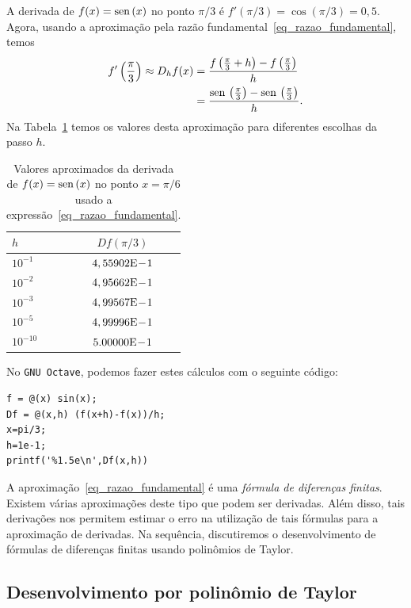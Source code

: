\begin{ex}\label{ex_intro_deriv}
  A derivada de $f(x) = \operatorname{sen}\,(x)$ no ponto $\pi/3$ é $f'(\pi/3) = \cos(\pi/3)=0,5$. Agora, usando a aproximação pela razão fundamental~\eqref{eq_razao_fundamental}, temos
  \begin{align}
    f'\left(\frac{\pi}{3}\right) \approx D_hf(x) &= \frac{f\left(\frac{\pi}{3}+h\right)-f\left(\frac{\pi}{3}\right)}{h}\\
          &= \frac{\operatorname{sen}\,\left(\frac{\pi}{3}\right)-\operatorname{sen}\,\left(\frac{\pi}{3}\right)}{h}. 
  \end{align}
Na Tabela~\ref{tab:ex_intro_deriv} temos os valores desta aproximação para diferentes escolhas da passo $h$.

\begin{table}[hp]
  \centering
  \begin{tabular}{l|c}
    $h$ & $Df(\pi/3)$ \\ \hline
    $10^{-1}$ & $4,55902\mathrm{E}\!-\!1$ \\
    $10^{-2}$ & $4,95662\mathrm{E}\!-\!1$ \\
    $10^{-3}$ & $4,99567\mathrm{E}\!-\!1$ \\
    $10^{-5}$ & $4,99996\mathrm{E}\!-\!1$ \\
    $10^{-10}$ & $5.00000\mathrm{E}\!-\!1$ \\\hline
  \end{tabular}
  \caption{Valores aproximados da derivada de $f(x)=\operatorname{sen}\,(x)$ no ponto $x=\pi/6$ usado a expressão~\eqref{eq_razao_fundamental}.}
  \label{tab:ex_intro_deriv}
\end{table}

No \verb+GNU Octave+, podemos fazer estes cálculos com o seguinte código:
\begin{verbatim}
f = @(x) sin(x);
Df = @(x,h) (f(x+h)-f(x))/h;
x=pi/3;
h=1e-1;
printf('%1.5e\n',Df(x,h))
\end{verbatim}
\end{ex}

A aproximação~\eqref{eq_razao_fundamental} é uma \emph{fórmula de diferenças finitas}. Existem várias aproximações deste tipo que podem ser derivadas. Além disso, tais derivações nos permitem estimar o erro na utilização de tais fórmulas para a aproximação de derivadas. Na sequência, discutiremos o desenvolvimento de fórmulas de diferenças finitas usando polinômios de Taylor.

\subsection{Desenvolvimento por polinômio de Taylor}

